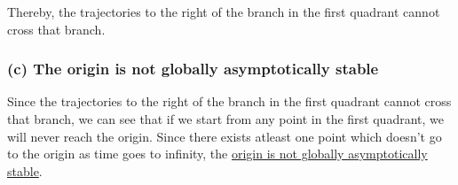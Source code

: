 Thereby, the trajectories to the right of the branch in the first quadrant cannot cross that branch.

\subsubsection*{(c) The origin is not globally asymptotically stable}

Since the trajectories to the right of the branch in the first quadrant cannot cross that branch, we can see that if we start from any point in the first quadrant, we will never reach the origin.
Since there exists atleast one point which doesn't go to the origin as time goes to infinity, the
\underline{origin is not globally asymptotically stable}.
